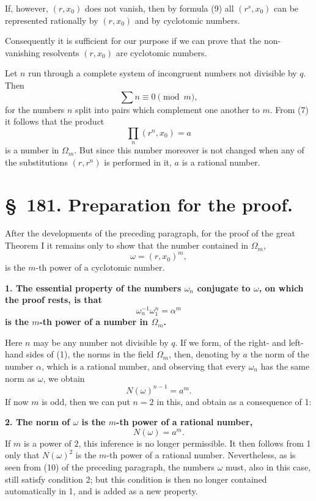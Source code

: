 \documentclass[11pt]{article}
\begin{document}
If, however, $(r,x_0)$ does not vanish, then by formula (9) all $(r^s,x_0)$ can be represented rationally by $(r,x_0)$ and by cyclotomic numbers.

Consequently it is sufficient for our purpose if we can prove that the non-vanishing resolvents $(r,x_0)$ are cyclotomic numbers.

Let $n$ run through a complete system of incongruent numbers not divisible by $q$. Then
\[
  \sum n\equiv 0\pmod m,
\]
for the numbers $n$ split into pairs which complement one another to $m$. From (7) it follows that the product
\begin{equation}
  \prod_n (r^n,x_0)=a
\tag{10}
\end{equation}
is a number in $\Omega_m$. But since this number moreover is not changed when any of the substitutions $(r,r^n)$ is performed in it, $a$ is a rational number.

\section*{\S~181. Preparation for the proof.}

After the developments of the preceding paragraph, for the proof of the great Theorem I it remains only to show that the number contained in $\Omega_m$,
\[
  \omega=(r,x_0)^m,
\]
is the $m$-th power of a cyclotomic number.

\textbf{1. The essential property of the numbers $\omega_n$ conjugate to $\omega$, on which the proof rests, is that}
\begin{equation}
  \omega_n^{-1}\omega_1^n=\alpha^m
\tag{1}
\end{equation}
\textbf{is the $m$-th power of a number in $\Omega_m$.}

Here $n$ may be any number not divisible by $q$. If we form, of the right- and left-hand sides of (1), the norms in the field $\Omega_m$, then, denoting by $a$ the norm of the number $\alpha$, which is a rational number, and observing that every $\omega_n$ has the same norm as $\omega$, we obtain
\[
  N(\omega)^{n-1}=a^m.
\]
If now $m$ is odd, then we can put $n=2$ in this, and obtain as a consequence of 1:

\textbf{2. The norm of $\omega$ is the $m$-th power of a rational number,}
\begin{equation}
  N(\omega)=a^m.
\tag{2}
\end{equation}
If $m$ is a power of $2$, this inference is no longer permissible. It then follows from 1 only that $N(\omega)^2$ is the $m$-th power of a rational number. Nevertheless, as is seen from (10) of the preceding paragraph, the numbers $\omega$ must, also in this case, still satisfy condition 2; but this condition is then no longer contained automatically in 1, and is added as a new property.
\end{document}
